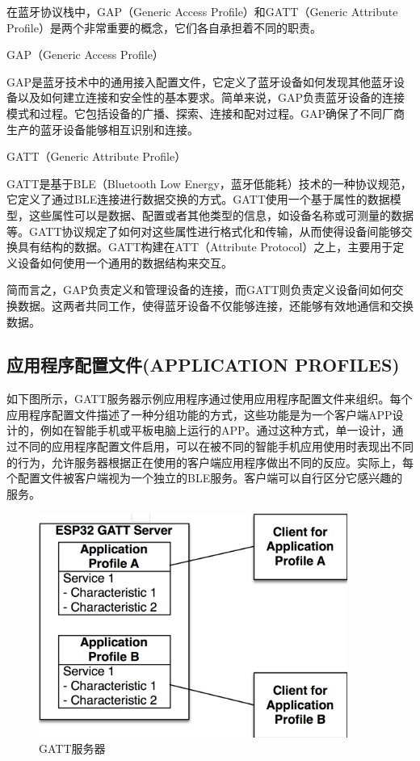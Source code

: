\documentclass[lang=cn,newtx,10pt,scheme=chinese]{elegantbook}
\begin{document}
\begin{marker}
在蓝牙协议栈中，GAP（Generic Access Profile）和GATT（Generic Attribute Profile）是两个非常重要的概念，它们各自承担着不同的职责。

GAP（Generic Access Profile）

GAP是蓝牙技术中的通用接入配置文件，它定义了蓝牙设备如何发现其他蓝牙设备以及如何建立连接和安全性的基本要求。简单来说，GAP负责蓝牙设备的连接模式和过程。它包括设备的广播、探索、连接和配对过程。GAP确保了不同厂商生产的蓝牙设备能够相互识别和连接。

GATT（Generic Attribute Profile）

GATT是基于BLE（Bluetooth Low Energy，蓝牙低能耗）技术的一种协议规范，它定义了通过BLE连接进行数据交换的方式。GATT使用一个基于属性的数据模型，这些属性可以是数据、配置或者其他类型的信息，如设备名称或可测量的数据等。GATT协议规定了如何对这些属性进行格式化和传输，从而使得设备间能够交换具有结构的数据。GATT构建在ATT（Attribute Protocol）之上，主要用于定义设备如何使用一个通用的数据结构来交互。

简而言之，GAP负责定义和管理设备的连接，而GATT则负责定义设备间如何交换数据。这两者共同工作，使得蓝牙设备不仅能够连接，还能够有效地通信和交换数据。
\end{marker}

\subsection{应用程序配置文件(APPLICATION PROFILES)}

如下图所示，GATT服务器示例应用程序通过使用应用程序配置文件来组织。每个应用程序配置文件描述了一种分组功能的方式，这些功能是为一个客户端APP设计的，例如在智能手机或平板电脑上运行的APP。通过这种方式，单一设计，通过不同的应用程序配置文件启用，可以在被不同的智能手机应用使用时表现出不同的行为，允许服务器根据正在使用的客户端应用程序做出不同的反应。实际上，每个配置文件被客户端视为一个独立的BLE服务。客户端可以自行区分它感兴趣的服务。

\begin{figure}[!htb]
\centering
\includegraphics[width=0.9\textwidth]{GATT_Server_Figure_1.png}
\caption{GATT服务器}
\end{figure}
\end{document}

